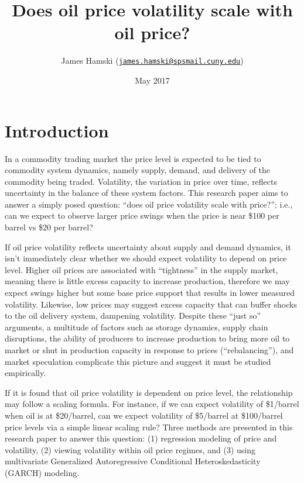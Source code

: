 \documentclass[]{article}
\title{Does oil price volatility scale with oil price?}
\author{James Hamski
(\href{mailto:james.hamski@spsmail.cuny.edu}{\nolinkurl{james.hamski@spsmail.cuny.edu}})}
\date{May 2017}
\begin{document}
\maketitle

\section{Introduction}\label{introduction}

In a commodity trading market the price level is expected to be tied to
commodity system dynamics, namely supply, demand, and delivery of the
commodity being traded. Volatility, the variation in price over time,
reflects uncertainty in the balance of these system factors. This
research paper aims to answer a simply posed question: ``does oil price
volatility scale with price?''; i.e., can we expect to observe larger
price swings when the price is near \$100 per barrel vs \$20 per barrel?

If oil price volatility reflects uncertainty about supply and demand
dynamics, it isn't immediately clear whether we should expect volatility
to depend on price level. Higher oil prices are associated with
``tightness'' in the supply market, meaning there is little excess
capacity to increase production, therefore we may expect swings higher
but some base price support that results in lower measured volatility.
Likewise, low prices may suggest excess capacity that can buffer shocks
to the oil delivery system, dampening volatility. Despite these ``just
so'' arguments, a multitude of factors such as storage dynamics, supply
chain disruptions, the ability of producers to increase production to
bring more oil to market or shut in production capacity in response to
prices (``rebalancing''), and market speculation complicate this picture
and suggest it must be studied empirically.

If it is found that oil price volatility is dependent on price level,
the relationship may follow a scaling formula. For instance, if we can
expect volatility of \$1/barrel when oil is at \$20/barrel, can we
expect volatility of \$5/barrel at \$100/barrel price levels via a
simple linear scaling rule? Three methods are presented in this research
paper to answer this question: (1) regression modeling of price and
volatility, (2) viewing volatility within oil price regimes, and (3)
using multivariate Generalized Autoregressive Conditional
Heteroskedasticity (GARCH) modeling.
\end{document}
